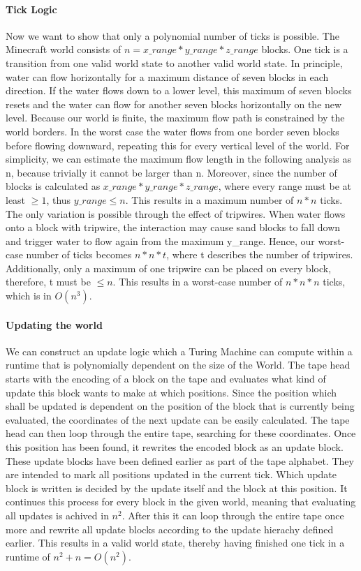 	\paragraph{Tick Logic}
	Now we want to show that only a polynomial number of ticks is possible. The Minecraft world consists of $n = x\_range * y\_range * z\_range$ blocks. One tick is a transition from one valid world state to another valid world state. In principle, water can flow horizontally for a maximum distance of seven blocks in each direction. If the water flows down to a lower level, this maximum of seven blocks resets and the water can flow for another seven blocks horizontally on the new level. Because our world is finite, the maximum flow path is constrained by the world borders. In the worst case the water flows from one border seven blocks before flowing downward, repeating this for every vertical level of the world. For simplicity, we can estimate the maximum flow length in the following analysis as n, because trivially it cannot be larger than n. Moreover, since the number of blocks is calculated as $x\_range * y\_range * z\_range$, where every range must be at least $\geq 1$, thus $y\_range \leq n$. This results in a maximum number of $n * n$ ticks. The only variation is possible through the effect of tripwires. When water flows onto a block with tripwire, the interaction may cause sand blocks to fall down and trigger water to flow again from the maximum y\_range. Hence, our worst-case number of ticks becomes $n * n * t$, where t describes the number of tripwires. Additionally, only a maximum of one tripwire can be placed on every block, therefore, t must be $\leq n$. This results in a worst-case number of $n * n * n$ ticks, which is in $O(n^{3})$.
	
	
	\paragraph{Updating the world}
	We can construct an update logic which a Turing Machine can compute within a runtime that is polynomially dependent on the size of the World.
	The tape head starts with the encoding of a block on the tape and evaluates what kind of update this block wants to make at which positions.
	Since the position which shall be updated is dependent on the position of the block that is currently being evaluated, the coordinates of the next update can be easily calculated.
	The tape head can then loop through the entire tape, searching for these coordinates.
	Once this position has been found, it rewrites the encoded block as an update block.
	These update blocks have been defined earlier as part of the tape alphabet. They are intended to mark all positions updated in the current tick.
	Which update block is written is decided by the update itself and the block at this position.
	It continues this process for every block in the given world, meaning that evaluating all updates is achived in $n^2$.
	After this it can loop through the entire tape once more and rewrite all update blocks according to the update hierachy defined earlier.
	This results in a valid world state, thereby having finished one tick in a runtime of $n^{2} + n = O(n^{2})$.
 

